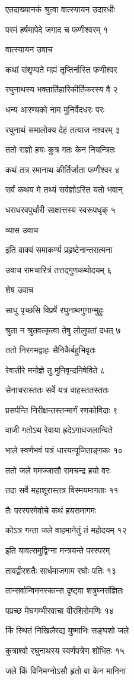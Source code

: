 एतदाख्यानकं श्रुत्वा वात्स्यायन उदारधीः

परमं हर्षमापेदे जगाद च फणीश्वरम् १

वात्स्यायन उवाच

कथां संशृण्वते मह्यं तृप्तिर्नास्ति फणीश्वर

रघुनाथस्य भक्तार्तिहारिकीर्तिकरस्य वै २

धन्य आरण्यको नाम मुनिर्वेदधरः परः

रघुनाथं समालोक्य देहं तत्याज नश्वरम् ३

ततो राज्ञो हयः कुत्र गतः केन नियन्त्रितः

कथं तत्र रमानाथ कीर्तिर्जाता फणीश्वर ४

सर्वं कथय मे तथ्यं सर्वज्ञोऽस्ति यतो भवान्

धराधरवपुर्धारी साक्षात्तस्य स्वरूपधृक् ५

व्यास उवाच

इति वाक्यं समाकर्ण्य प्रहृष्टेनान्तरात्मना

उवाच रामचारित्रं तत्तद्गुणकथोदयम् ६

शेष उवाच

साधु पृच्छसि विप्रर्षे रघुनाथगुणान्मुहुः

श्रुता न श्रुतवत्कृत्वा तेषु लोलुपतां दधत् ७

ततो निरगमद्वाहः सैनिकैर्बहुभिवृतः

रेवातीरे मनोज्ञे तु मुनिवृन्दनिषेविते ८

सेनाचरास्ततः सर्वे यत्र वाहस्ततस्ततः

प्रसर्पन्ति निरीक्षन्तस्तन्मार्गं रणकोविदाः ९

वाजी गतोऽथ रेवाया ह्रदेऽगाधजलान्विते

भाले स्वर्णभवं पत्रं धारयन्पूजिताङ्गकः १०

ततो जले ममज्जासौ रामचन्द्र हयो वरः

तदा सर्वे महाशूरास्तत्र विस्मयमागताः ११

तैः परस्परमेवोचे कथं हयसमागमः

कोऽत्र गन्ता जले वाहमानेतुं तं महोदयम् १२

इति यावत्समुद्विग्ना मन्त्रयन्ते परस्परम्

तावद्वीरशतैः सार्धमाजगाम रघोः पतिः १३

तान्सर्वान्विमनस्कान्स दृष्ट्वा शत्रुघ्नसंज्ञितः

पप्रच्छ मेघगम्भीरवाचा वीरशिरोमणिः १४

किं स्थितं निखिलैरद्य युष्माभिः सङ्घशो जले

कुत्राश्वो रघुनाथस्य स्वर्णपत्रेण शोभितः १५

जले किं विनिमग्नोऽसौ हृतो वा केन मानिना

